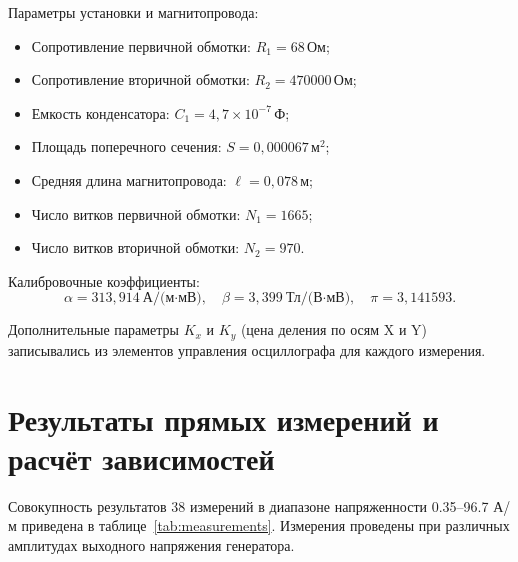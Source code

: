 \documentclass[a4paper,14pt]{article}
\begin{document}
Параметры установки и магнитопровода:
\begin{itemize}
    \item Сопротивление первичной обмотки: $R_1 = 68$\,Ом;
    \item Сопротивление вторичной обмотки: $R_2 = 470000$\,Ом;
    \item Емкость конденсатора: $C_1 = 4{,}7 \times 10^{-7}$\,Ф;
    \item Площадь поперечного сечения: $S = 0{,}000067$\,м$^2$;
    \item Средняя длина магнитопровода: $\ell = 0{,}078$\,м;
    \item Число витков первичной обмотки: $N_1 = 1665$;
    \item Число витков вторичной обмотки: $N_2 = 970$.
\end{itemize}

Калибровочные коэффициенты:
\[
    \alpha = 313{,}914\ \text{А/(м·мВ)}, \quad \beta = 3{,}399\ \text{Тл/(В·мВ)}, \quad \pi = 3{,}141593.
\]

Дополнительные параметры $K_x$ и $K_y$ (цена деления по осям X и Y) записывались из элементов управления осциллографа для каждого измерения.

\section{Результаты прямых измерений и расчёт зависимостей}

Совокупность результатов 38 измерений в диапазоне напряженности 0.35--96.7 А/м приведена в таблице~\ref{tab:measurements}. Измерения проведены при различных амплитудах выходного напряжения генератора.
\end{document}
